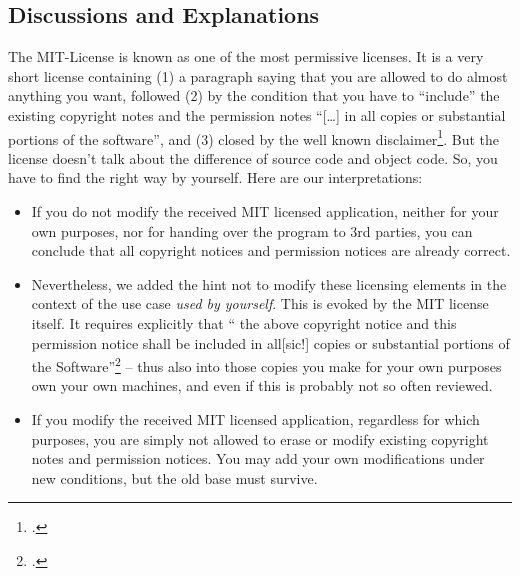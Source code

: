 \subsection{Discussions and Explanations}

The MIT-License is known as one of the most permissive licenses. It is a very
short license containing (1) a paragraph saying that you are allowed to do
almost anything you want, followed (2) by the condition that you have to
\enquote{include} the existing copyright notes and the permission notes
\enquote{[\ldots] in all copies or substantial portions of the software}, and
(3) closed by the well known disclaimer\footcite[cf.][\nopage
wp]{MitLicense2012a}. But the license doesn't talk about the difference of
source code and object code. So, you have to find the right way by yourself.
Here are our interpretations:

\begin{itemize}
  \item If you do not modify the received MIT licensed application, neither for
  your own purposes, nor for handing over the program to 3rd parties, you can
  conclude that all copyright notices and permission notices are already
  correct.
  \item Nevertheless, we added the hint not to modify these licensing elements
  in the context of the use case \emph{used by yourself}. This is evoked by the
  MIT license itself. It requires explicitly that \enquote{ the above copyright
  notice and this permission notice shall be included in all[sic!] copies or
  substantial portions of the Software}\footcite[cf.][\nopage
  wp]{MitLicense2012a} -- thus also into those copies you make for your own
  purposes own your own machines, and even if this is probably not so often
  reviewed.
  \item If you modify the received MIT licensed application, regardless for
  which purposes, you are simply not allowed to erase or modify existing
  copyright notes and permission notices. You may add your own modifications
  under new conditions, but the old base must survive.
\end{itemize}

%
